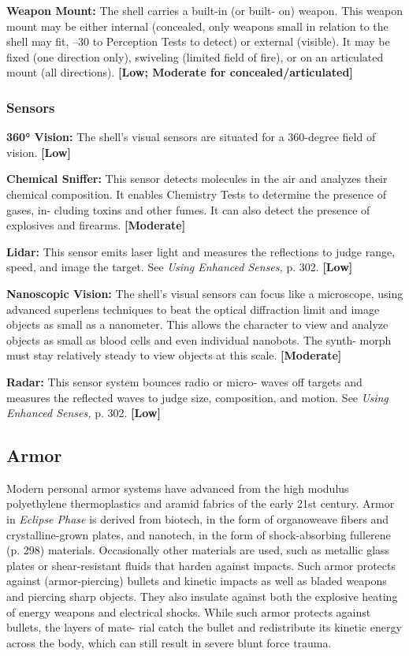 \textbf{Weapon Mount:} The shell carries a built-in (or built-
on) weapon. This weapon mount may be either internal 
(concealed, only weapons small in relation to the shell 
may fit, –30 to Perception Tests to detect) or external 
(visible). It may be fixed (one direction only), swiveling 
(limited field of fire), or on an articulated mount (all 
directions). \textbf{[Low; Moderate for concealed/articulated]}

\subsubsection{Sensors}

\textbf{360° Vision: }The shell's visual sensors are situated for 
a 360-degree field of vision. \textbf{[Low]}

\textbf{Chemical Sniffer:} This sensor detects molecules in the 
air and analyzes their chemical composition. It enables 
Chemistry Tests to determine the presence of gases, in-
cluding toxins and other fumes. It can also detect the 
presence of explosives and firearms. \textbf{[Moderate]}

\textbf{Lidar:} This sensor emits laser light and measures 
the reflections to judge range, speed, and image the 
target. See \textit{Using Enhanced Senses,} p. 302. \textbf{[Low]}

\textbf{Nanoscopic Vision:} The shell's visual sensors can 
focus like a microscope, using advanced superlens 
techniques to beat the optical diffraction limit and 
image objects as small as a nanometer. This allows 
the character to view and analyze objects as small as 
blood cells and even individual nanobots. The synth-
morph must stay relatively steady to view objects at 
this scale. \textbf{[Moderate]}

\textbf{Radar:} This sensor system bounces radio or micro-
waves off targets and measures the reflected waves 
to judge size, composition, and motion. See \textit{Using }
\textit{Enhanced Senses,} p. 302. \textbf{[Low]}

\subsection{Armor}

Modern personal armor systems have advanced from 
the high modulus polyethylene thermoplastics and 
aramid fabrics of the early 21st century. Armor in 
\textit{Eclipse Phase} is derived from biotech, in the form of 
organoweave fibers and crystalline-grown plates, and 
nanotech, in the form of shock-absorbing fullerene (p. 
298) materials. Occasionally other materials are used, 
such as metallic glass plates or shear-resistant fluids 
that harden against impacts. Such armor protects 
against (armor-piercing) bullets and kinetic impacts 
as well as bladed weapons and piercing sharp objects. 
They also insulate against both the explosive heating 
of energy weapons and electrical shocks. While such 
armor protects against bullets, the layers of mate-
rial catch the bullet and redistribute its kinetic energy 
across the body, which can still result in severe blunt 
force trauma.

